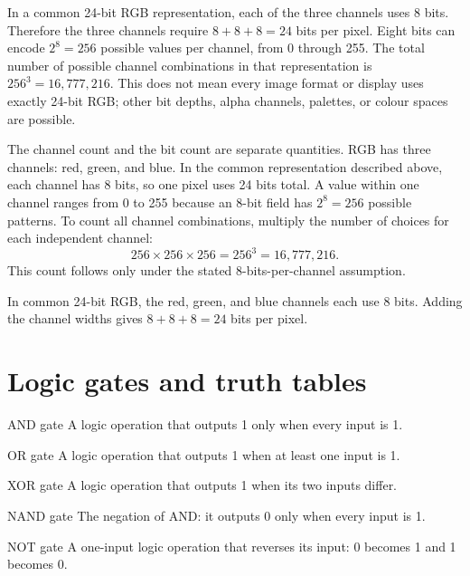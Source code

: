 In a common 24-bit RGB representation, each of the three channels uses 8
bits. Therefore the three channels require $8+8+8=24$ bits per pixel.
Eight bits can encode $2^8=256$ possible values per channel, from 0 through
255. The total number of possible channel combinations in that representation
is $256^3=16{,}777{,}216$. This does not mean every image format or display
uses exactly 24-bit RGB; other bit depths, alpha channels, palettes, or
colour spaces are possible.

The channel count and the bit count are separate quantities. RGB has three
channels: red, green, and blue. In the common representation described
above, each channel has 8 bits, so one pixel uses 24 bits total. A value
within one channel ranges from 0 to 255 because an 8-bit field has
$2^8=256$ possible patterns. To count all channel combinations, multiply
the number of choices for each independent channel:
\[
  256\times256\times256=256^3=16{,}777{,}216.
\]
This count follows only under the stated 8-bits-per-channel assumption.

\begin{example}
In common 24-bit RGB, the red, green, and blue channels each use 8 bits.
Adding the channel widths gives $8+8+8=24$ bits per pixel.
\end{example}

\section{Logic gates and truth tables}
\begin{definitionbox}{AND gate}
A logic operation that outputs 1 only when every input is 1.
\end{definitionbox}

\begin{definitionbox}{OR gate}
A logic operation that outputs 1 when at least one input is 1.
\end{definitionbox}

\begin{definitionbox}{XOR gate}
A logic operation that outputs 1 when its two inputs differ.
\end{definitionbox}

\begin{definitionbox}{NAND gate}
The negation of AND: it outputs 0 only when every input is 1.
\end{definitionbox}

\begin{definitionbox}{NOT gate}
A one-input logic operation that reverses its input: 0 becomes 1 and 1
becomes 0.
\end{definitionbox}

